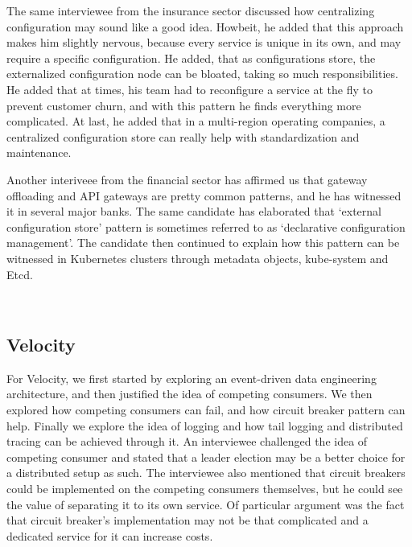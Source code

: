 \documentclass{bmcart}
\begin{document}
The same interviewee from the insurance sector discussed how centralizing configuration may sound like a good idea. Howbeit, he added that this approach makes him slightly nervous, because every service is unique in its own, and may require a specific configuration. He added, that as configurations store, the externalized configuration node can be bloated, taking so much responsibilities. He added that at times, his team had to reconfigure a service at the fly to prevent customer churn, and with this pattern he finds everything more complicated. At last, he added that in a multi-region operating companies, a centralized configuration store can really help with standardization and maintenance. 


Another interiveee from the financial sector has affirmed us that gateway offloading and API gateways are pretty common patterns, and he has witnessed it in several major banks. The same candidate has elaborated that `external configuration store' pattern is sometimes referred to as `declarative configuration management'. The candidate then continued to explain how this pattern can be witnessed in Kubernetes clusters through metadata objects, kube-system and Etcd.


\,

\setlength{\fboxsep}{0.7em}
\noindent{}


\subsection{Velocity}

For Velocity, we first started by exploring an event-driven data engineering architecture, and then justified the idea of competing consumers. We then explored how competing consumers can fail, and how circuit breaker pattern can help. Finally we explore the idea of logging and how tail logging and distributed tracing can be achieved through it. An interviewee challenged the idea of competing consumer and stated that a leader election may be a better choice for a distributed setup as such. The interviewee also mentioned that circuit breakers could be implemented on the competing consumers themselves, but he could see the value of separating it to its own service. Of particular argument was the fact that circuit breaker's implementation may not be that complicated and a dedicated service for it can increase costs.  
\end{document}
